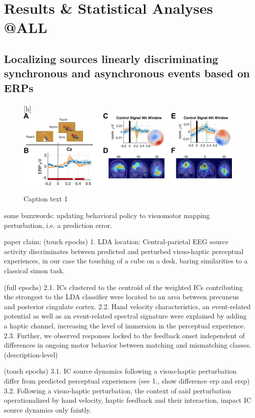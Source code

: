 \section{Results \& Statistical Analyses @ALL}
\subsection{Localizing sources linearly discriminating synchronous and asynchronous events based on ERPs}

\begin{figure}{\textwidth}[h]
    \centering\includegraphics[width=\textwidth]{figures/fig1_lda/fig1_lda.pdf}
    \label{lda}
    \caption{Caption text 1}
\end{figure}

some buzzwords:
updating behavioral policy to 
visuomotor mapping
perturbation, i.e. a prediction error.

paper claim:
(touch epochs)
1. LDA location: Central-parietal EEG source activity discriminates between predicted and perturbed visuo-haptic perceptual experiences, in our case the touching of a cube on a desk, baring similarities to a classical simon task.

(full epochs)
2.1. ICs clustered to the centroid of the weighted ICs contributing the strongest to the LDA classifier were located to an area between precuneus and posterior cingulate cortex.
2.2. Hand velocity characteristics, an event-related potential as well as an event-related spectral signature were explained by adding a haptic channel, increasing the level of immersion in the perceptual experience.
2.3. Further, we observed responses locked to the feedback onset independent of differences in ongoing motor behavior between matching and mismatching classes. (description-level)

(touch epochs)
3.1. IC source dynamics following a visuo-haptic perturbation differ from predicted perceptual experiences (see 1., show difference erp and ersp)
3.2. Following a visuo-haptic perturbation, the context of said perturbation operationalized by hand velocity, haptic feedback and their interaction, impact IC source dynamics only faintly.

